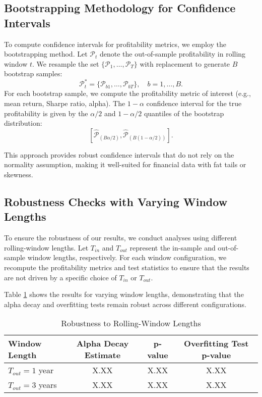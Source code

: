\subsection{Bootstrapping Methodology for Confidence Intervals}

To compute confidence intervals for profitability metrics, we employ the bootstrapping method. Let $\mathcal{P}_t$ denote the out-of-sample profitability in rolling window $t$. We resample the set $\{\mathcal{P}_1, \dots, \mathcal{P}_T\}$ with replacement to generate $B$ bootstrap samples:
\[
\mathcal{P}^*_t = \{ \mathcal{P}_{b1}, \dots, \mathcal{P}_{bT} \}, \quad b=1,\dots,B.
\]
For each bootstrap sample, we compute the profitability metric of interest (e.g., mean return, Sharpe ratio, alpha). The $1-\alpha$ confidence interval for the true profitability is given by the $\alpha/2$ and $1-\alpha/2$ quantiles of the bootstrap distribution:
\[
[\hat{\mathcal{P}}_{(B\alpha/2)}, \hat{\mathcal{P}}_{(B(1-\alpha/2))}].
\]

This approach provides robust confidence intervals that do not rely on the normality assumption, making it well-suited for financial data with fat tails or skewness.

\subsection{Robustness Checks with Varying Window Lengths}

To ensure the robustness of our results, we conduct analyses using different rolling-window lengths. Let $T_{in}$ and $T_{out}$ represent the in-sample and out-of-sample window lengths, respectively. For each window configuration, we recompute the profitability metrics and test statistics to ensure that the results are not driven by a specific choice of $T_{in}$ or $T_{out}$.

Table \ref{tab:window_robustness} shows the results for varying window lengths, demonstrating that the alpha decay and overfitting tests remain robust across different configurations.

\begin{table}[H]
    \centering
    \caption{Robustness to Rolling-Window Lengths}
    \label{tab:window_robustness}
    \begin{tabular}{lccc}
        \hline
        \textbf{Window Length} & \textbf{Alpha Decay Estimate} & \textbf{p-value} & \textbf{Overfitting Test p-value} \\
        \hline
        $T_{out} = 1$ year & X.XX & X.XX & X.XX \\
        $T_{out} = 3$ years & X.XX & X.XX & X.XX \\
        \hline
    \end{tabular}
\end{table}

